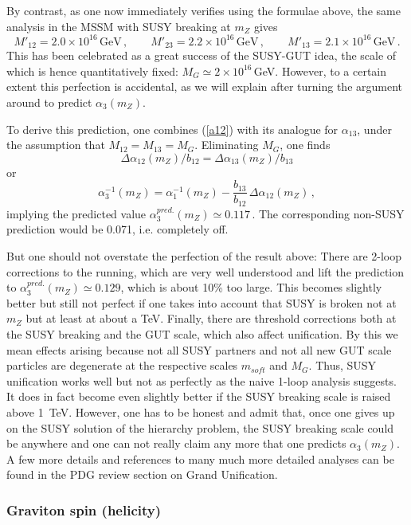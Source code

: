 \documentclass[12pt]{article}
\newcommand{\be}{\begin{equation}}
\newcommand{\ee}{\end{equation}}
\numberwithin{equation}{section}
\begin{document}
By contrast, as one now immediately verifies using the formulae above, the same analysis in the MSSM with SUSY breaking at $m_Z$ gives
\be
M'_{12}=2.0\times 10^{16}\,\mbox{GeV}\,,\qquad
M'_{23}=2.2\times 10^{16}\,\mbox{GeV}\,,\qquad
M'_{13}=2.1\times 10^{16}\,\mbox{GeV}\,.
\ee
This has been celebrated as a great success of the SUSY-GUT idea, the scale of which is hence quantitatively fixed: $M_G\simeq 2\times 10^{16}\,$GeV. However, to a certain extent this perfection is accidental, as we will explain after turning the argument around to predict $\alpha_3(m_Z)$. 

To derive this prediction, one combines (\ref{a12}) with its analogue for $\alpha_{13}$, under the assumption that $M_{12}=M_{13}=M_G$. Eliminating $M_G$, one finds
\be
\Delta\alpha_{12}(m_Z)/b_{12}=\Delta\alpha_{13}(m_Z)/b_{13}
\ee
or
\be
\alpha_3^{-1}(m_Z)=\alpha_1^{-1}(m_Z)-\frac{b_{13}}{b_{12}}\, \Delta\alpha_{12}(m_Z)\,,
\ee
implying the predicted value $\alpha^{pred.}_3(m_Z)\simeq 0.117\,$. The corresponding non-SUSY prediction would be 0.071, i.e. completely off.

But one should not overstate the perfection of the result above: There are 2-loop corrections to the running, which are very well understood and lift the prediction to $\alpha^{pred.}_3(m_Z)\simeq 0.129$, which is about 10\% too large. This becomes slightly better but still not perfect if one takes into account that SUSY is broken not at $m_Z$ but at least at about a TeV. Finally, there are threshold corrections both at the SUSY breaking and the GUT scale, which also affect unification. By this we mean effects arising because not all SUSY partners and not all new GUT scale particles are degenerate at the respective scales $m_{soft}$ and $M_G$. Thus, SUSY unification works well but not as perfectly as the naive 1-loop analysis suggests. It does in fact become even slightly better if the SUSY breaking scale is raised above 1~TeV. However, one has to be honest and admit that, once one gives up on the SUSY solution of the hierarchy  problem, the SUSY breaking scale could be anywhere and one can not really claim any more that one predicts $\alpha_3(m_Z)$. A few more details and references to many much more detailed analyses can be found in the PDG review section on Grand Unification.






\subsubsection{Graviton spin (helicity)}
\end{document}
